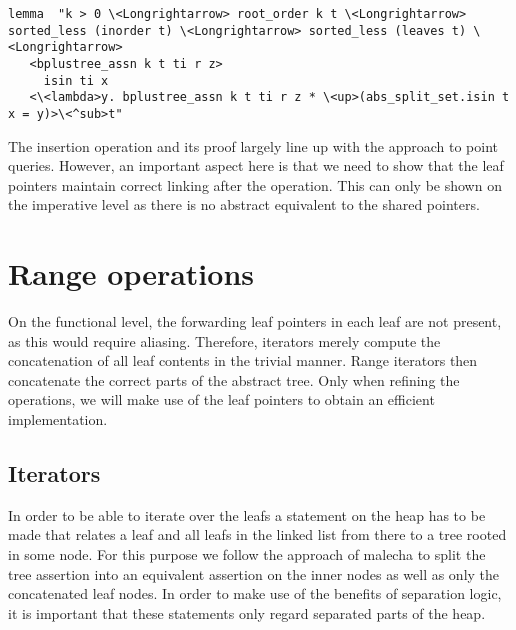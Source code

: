 \documentclass[a4paper,UKenglish,cleveref, autoref, thm-restate]{lipics-v2021}
\begin{document}
\begin{lstlisting}[mathescape=true, language=Isabelle,label=lst:isin-refines]
lemma  "k > 0 \<Longrightarrow> root_order k t \<Longrightarrow> sorted_less (inorder t) \<Longrightarrow> sorted_less (leaves t) \<Longrightarrow>
   <bplustree_assn k t ti r z>
     isin ti x
   <\<lambda>y. bplustree_assn k t ti r z * \<up>(abs_split_set.isin t x = y)>\<^sub>t"
\end{lstlisting}

The insertion operation and its proof largely line up with the approach to point queries.
However, an important aspect here is that we need to show that the leaf pointers
maintain correct linking after the operation.
This can only be shown on the imperative level as there is no abstract equivalent
to the shared pointers.


%
%
%


\section{Range operations}
\label{sec:range}

On the functional level, the forwarding leaf pointers in each leaf
are not present, as this would require aliasing.
Therefore, iterators merely compute the concatenation
of all leaf contents in the trivial manner.
Range iterators then concatenate the correct parts of the
abstract tree.
Only when refining the operations, we will make use of the leaf pointers
to obtain an efficient implementation.

\subsection{Iterators}
\label{sec:imperative_iter}

In order to be able to iterate over the leafs
a statement on the heap has to be made that relates
a leaf and all leafs in the linked list from there
to a tree rooted in some node.
For this purpose we follow the approach of malecha
to split the tree assertion into an equivalent assertion
on the inner nodes as well as only the concatenated leaf nodes.
In order to make use of the benefits of separation logic,
it is important that these statements only regard separated parts of the heap.
\end{document}
